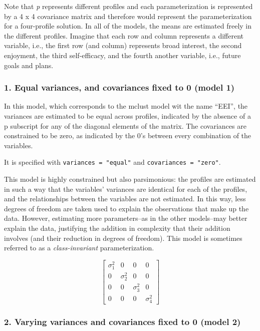 \documentclass[english,man]{apa6}
\begin{document}
Note that \emph{p} represents different profiles and each parameterization is represented by a 4 x 4 covariance matrix and therefore would represent the parameterization for a four-profile solution. In all of the models, the means are estimated freely in the different profiles. Imagine that each row and column represents a different variable, i.e., the first row (and column) represents broad interest, the second enjoyment, the third self-efficacy, and the fourth another variable, i.e., future goals and plans.

\hypertarget{equal-variances-and-covariances-fixed-to-0-model-1}{%
\subsubsection{1. Equal variances, and covariances fixed to 0 (model 1)}\label{equal-variances-and-covariances-fixed-to-0-model-1}}

In this model, which corresponds to the mclust model wit the name \enquote{EEI}, the variances are estimated to be equal across profiles, indicated by the absence of a p subscript for any of the diagonal elements of the matrix. The covariances are constrained to be zero, as indicated by the 0's between every combination of the variables.

It is specified with \texttt{variances\ =\ "equal"} and \texttt{covariances\ =\ "zero"}.

This model is highly constrained but also parsimonious: the profiles are estimated in such a way that the variables' variances are identical for each of the profiles, and the relationships between the variables are not estimated. In this way, less degrees of freedom are taken used to explain the observations that make up the data. However, estimating more parameters--as in the other models--may better explain the data, justifying the addition in complexity that their addition involves (and their reduction in degrees of freedom). This model is sometimes referred to as a \emph{class-invariant} parameterization.

\[
\left[ \begin{matrix} { \sigma  }_{ 1 }^{ 2 } & 0 & 0 & 0 \\ 0 & { \sigma  }_{ 2 }^{ 2 } & 0 & 0 \\ 0 & 0 & { \sigma  }_{ 3 }^{ 2 } & 0 \\ 0 & 0 & 0 & { \sigma  }_{ 4 }^{ 2 } \end{matrix} \right] 
\]

\hypertarget{varying-variances-and-covariances-fixed-to-0-model-2}{%
\subsubsection{2. Varying variances and covariances fixed to 0 (model 2)}\label{varying-variances-and-covariances-fixed-to-0-model-2}}
\end{document}
